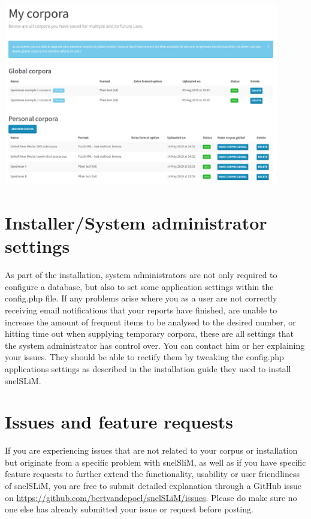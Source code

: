 \documentclass[11pt,a4paper]{article}
\begin{document}
\centerline{\includegraphics[width=0.9\textwidth]{images/admincorpora.png}}

\section{Installer/System administrator settings}

As part of the installation, system administrators are not only required to configure a database, but also to set some application settings within the config.php file. If any problems arise where you as a user are not correctly receiving email notifications that your reports have finished, are unable to increase the amount of frequent items to be analysed to the desired number, or hitting time out when supplying temporary corpora, these are all settings that the system administrator has control over. You can contact him or her explaining your issues. They should be able to rectify them by tweaking the config.php applications settings as described in the installation guide they used to install snelSLiM. 

\section{Issues and feature requests}

If you are experiencing issues that are not related to your corpus or installation but originate from a specific problem with snelSliM, as well as if you have specific feature requests to further extend the functionality, usability or user friendliness of snelSLiM, you are free to submit detailed explanation through a GitHub issue on \url{https://github.com/bertvandepoel/snelSLiM/issues}. Please do make sure no one else has already submitted your issue or request before posting.
\end{document}
